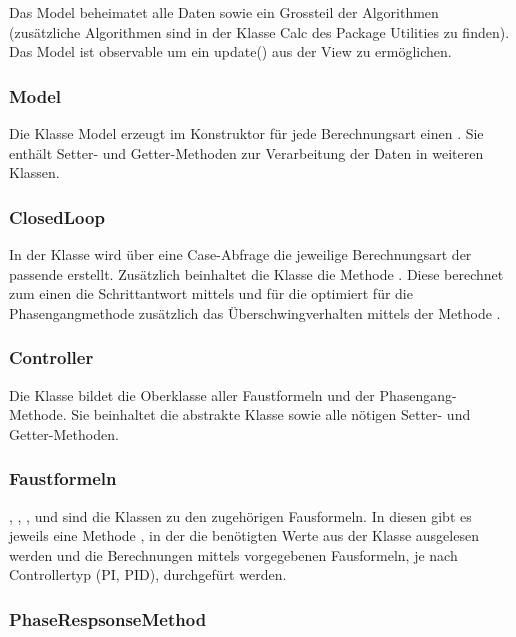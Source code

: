 Das  Model  beheimatet   alle  Daten  sowie  ein   Grossteil  der  Algorithmen
(zus\"atzliche  Algorithmen sind  in  der Klasse  Calc  des Package  Utilities
zu  finden). Das  Model  ist  observable  um ein  update()  aus  der  View  zu
erm\"oglichen.

\subsubsection*{Model}
Die  Klasse  Model erzeugt  im  Konstruktor  f\"ur jede  Berechnungsart  einen
. Sie enth\"alt Setter-  und Getter-Methoden zur Verarbeitung
der Daten in weiteren Klassen.

\subsubsection*{ClosedLoop}
In   der  Klasse      wird  \"uber   eine  Case-Abfrage   die
jeweilige Berechnungsart der passende  erstellt. Zus\"atzlich
beinhaltet  die Klasse  die  Methode  . Diese berechnet  zum
einen die Schrittantwort mittels   und f\"ur die
optimiert f\"ur die  Phasengangmethode zus\"atzlich das \"Uberschwingverhalten
mittels der Methode .


\subsubsection*{Controller}
Die Klasse  bildet die  Oberklasse aller Faustformeln und der
Phasengang-Methode. Sie  beinhaltet  die abstrakte  Klasse  
sowie alle n\"otigen Setter- und Getter-Methoden.

\subsubsection*{Faustformeln}

,   ,   ,      und
 sind  die Klassen  zu den  zugeh\"origen Fausformeln. In
diesen  gibt   es  jeweils  eine   Methode  ,  in   der  die
ben\"otigten  Werte  aus der  Klasse    ausgelesen werden  und  die
Berechnungen  mittels vorgegebenen  Fausformeln,  je  nach Controllertyp  (PI,
PID), durchgef\"urt werden.

\subsubsection*{PhaseRespsonseMethod}

